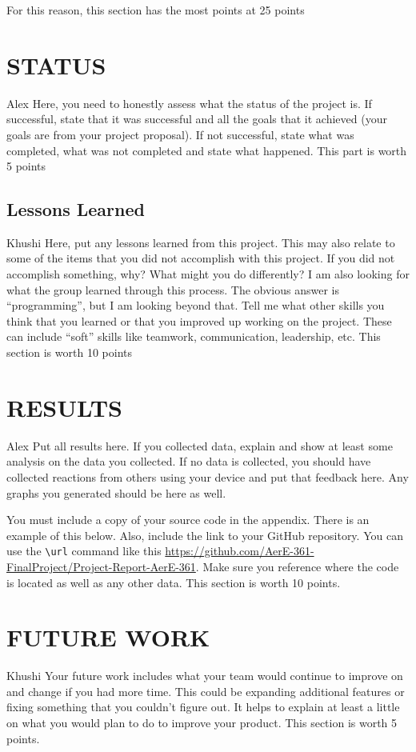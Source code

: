 \documentclass[12pt]{article}
\begin{document}
For this reason, this section has the most points at 25 points

\section{STATUS}
Alex
Here, you need to honestly assess what the status of the project is.  If successful, state that it was successful and all the goals that it achieved (your goals are from your project proposal).  If not successful, state what was completed, what was not completed and state what happened. This part is worth 5 points

\subsection{Lessons Learned}
Khushi
Here, put any lessons learned from this project.  This may also relate to some of the items that you did not accomplish with this project. If you did not accomplish something, why? What might you do differently? I am also looking for what the group learned through this process. The obvious answer is ``programming'', but I am looking beyond that. Tell me what other skills you think that you learned or that you improved up working on the project. These can include ``soft'' skills like teamwork, communication, leadership, etc. This section is worth 10 points

\section{RESULTS}
 Alex
Put all results here.  If you collected data, explain and show at least some analysis on the data you collected.  If no data is collected, you should have collected reactions from others using your device and put that feedback here.  Any graphs you generated should be here as well.

You must include a copy of your source code in the appendix.  There is an example of this below.  Also, include the link to your GitHub repository.  You can use the \verb=\url=  command like this \url{https://github.com/AerE-361-FinalProject/Project-Report-AerE-361}. Make sure you reference where the code is located as well as any other data. This section is worth 10 points.


\section{FUTURE WORK}
Khushi
Your future work includes what your team would continue to improve on and change if you had more time.  This could be expanding additional features or fixing something that you couldn't figure out.  It helps to explain at least a little on what you would plan to do to improve your product. This section is worth 5 points.
\end{document}
